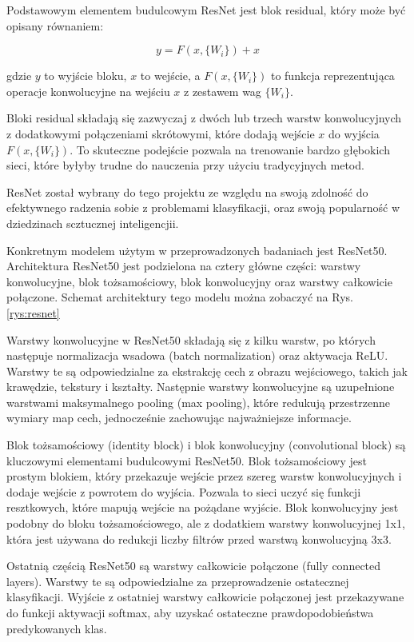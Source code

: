 Podstawowym elementem budulcowym ResNet jest blok residual, który może być opisany równaniem:

\begin{equation}
    y = F(x, \{W_i\}) + x
\end{equation}

gdzie \( y \) to wyjście bloku, \( x \) to wejście, a \( F(x, \{W_i\}) \) to funkcja reprezentująca operacje konwolucyjne na wejściu \( x \) z zestawem wag \( \{W_i\} \).

Bloki residual składają się zazwyczaj z dwóch lub trzech warstw konwolucyjnych z dodatkowymi połączeniami skrótowymi, które dodają wejście \( x \) do wyjścia \( F(x, \{W_i\}) \). To skuteczne podejście pozwala na trenowanie bardzo głębokich 
sieci, które byłyby trudne do nauczenia przy użyciu tradycyjnych metod.

ResNet został wybrany do tego projektu ze względu na swoją zdolność do efektywnego radzenia sobie z problemami klasyfikacji, oraz swoją popularność w dziedzinach scztucznej inteligencjii. 

Konkretnym modelem użytym w przeprowadzonych badaniach jest ResNet50. Architektura ResNet50 jest podzielona na cztery główne części: warstwy konwolucyjne, blok tożsamościowy, blok konwolucyjny oraz warstwy całkowicie połączone. 
Schemat architektury tego modelu można zobaczyć na Rys. \ref*{rys:resnet}

Warstwy konwolucyjne w ResNet50 składają się z kilku warstw, po których następuje normalizacja wsadowa (batch normalization) oraz aktywacja ReLU. Warstwy te są odpowiedzialne za ekstrakcję cech z obrazu wejściowego, takich jak 
krawędzie, tekstury i kształty. Następnie warstwy konwolucyjne są uzupełnione warstwami maksymalnego pooling (max pooling), które redukują przestrzenne wymiary map cech, jednocześnie zachowując najważniejsze informacje.

Blok tożsamościowy (identity block) i blok konwolucyjny (convolutional block) są kluczowymi elementami budulcowymi ResNet50. Blok tożsamościowy jest prostym blokiem, który przekazuje wejście przez szereg warstw konwolucyjnych i dodaje wejście z 
powrotem do wyjścia. Pozwala to sieci uczyć się funkcji resztkowych, które mapują wejście na pożądane wyjście. Blok konwolucyjny jest podobny do bloku tożsamościowego, ale z dodatkiem warstwy konwolucyjnej 1x1, która jest używana do redukcji 
liczby filtrów przed warstwą konwolucyjną 3x3.

Ostatnią częścią ResNet50 są warstwy całkowicie połączone (fully connected layers). Warstwy te są odpowiedzialne za przeprowadzenie ostatecznej klasyfikacji. Wyjście z ostatniej warstwy całkowicie połączonej jest przekazywane do funkcji 
aktywacji softmax, aby uzyskać ostateczne prawdopodobieństwa predykowanych klas.

